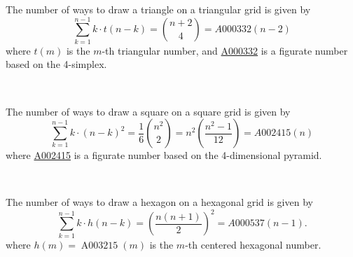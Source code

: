\documentclass{article}
\begin{document}
The number of ways to draw a triangle on a triangular grid is given by \[
  \sum_{k=1}^{n-1} k\cdot t(n-k)
  = \binom{n+2}{4}
  = A000332(n-2)
\] where $t(m)$ is the $m$-th triangular number, and
\href{https://oeis.org/A000332}{A000332} is a figurate number based on the 4-simplex.

~

\noindent
The number of ways to draw a square on a square grid is given by \[
  \sum_{k=1}^{n-1} k\cdot (n-k)^2
  = \frac 16 \binom{n^2}{2}
  = n^2\left(\frac{n^2 - 1}{12}\right)
  = A002415(n)
\] where \href{https://oeis.org/A002415}{A002415} is a figurate number based on the 4-dimensional pyramid.

~

\noindent
The number of ways to draw a hexagon on a hexagonal grid is given by \[
  \sum_{k=1}^{n-1} k\cdot h(n-k)
  = \left(\frac{n(n+1)}{2}\right)^2
  = A000537(n-1).
\] where $h(m) = \operatorname{A003215}(m)$ is the $m$-th centered hexagonal number.
\end{document}
